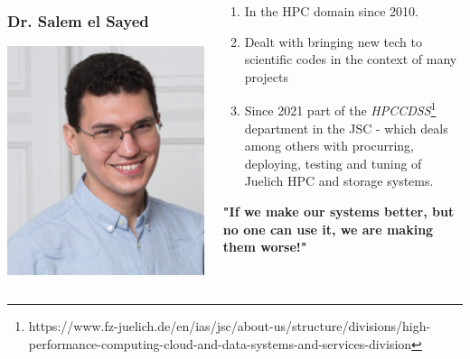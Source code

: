 \documentclass[aspectratio=1610,10pt]{penchbeamer}
\begin{document}
\begin{frame}
  \begin{columns}
    \begin{column}{0.3\textwidth}
      \frametitle{{\small Dr.} Salem el Sayed}
      \begin{huge}
        \includegraphics[scale=0.07]{images/SalemElSayed-Portrait.jpg}
      \end{huge}
    \end{column}
    \begin{column}{0.6\textwidth}
      \begin{enumerate}
        \item In the HPC domain since 2010.
        \item Dealt with bringing new tech to scientific codes in the context of many projects
        \item Since 2021 part of the \textit{HPCCDSS}\footnote{https://www.fz-juelich.de/en/ias/jsc/about-us/structure/divisions/high-performance-computing-cloud-and-data-systems-and-services-division} department in the JSC - which deals among others with procurring, deploying, testing and tuning of Juelich HPC and storage systems.
      \end{enumerate}
      \textbf{"If we make our systems better, but no one can use it, we are making them worse!"}
    \end{column}
  \end{columns}
\end{frame}
\end{document}
